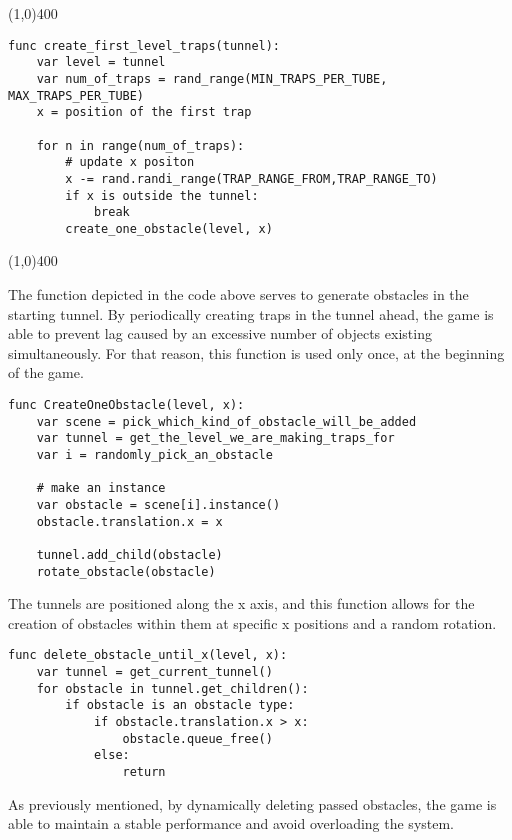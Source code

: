 \begin{center}
\line(1,0){400}
\begin{lstlisting}
func create_first_level_traps(tunnel):
	var level = tunnel
	var num_of_traps = rand_range(MIN_TRAPS_PER_TUBE, MAX_TRAPS_PER_TUBE)
	x = position of the first trap
	
	for n in range(num_of_traps):
		# update x positon
		x -= rand.randi_range(TRAP_RANGE_FROM,TRAP_RANGE_TO)
		if x is outside the tunnel:
			break
		create_one_obstacle(level, x)
\end{lstlisting}
\line(1,0){400}
\end{center}

The function depicted in the code above serves to generate obstacles in the starting tunnel. By periodically creating traps in the tunnel ahead, the game is able to prevent lag caused by an excessive number of objects existing simultaneously. For that reason, this function is used only once, at the beginning of the game.

\begin{center}
\hrulefill
\begin{lstlisting}
func CreateOneObstacle(level, x):
	var scene = pick_which_kind_of_obstacle_will_be_added
	var tunnel = get_the_level_we_are_making_traps_for
	var i = randomly_pick_an_obstacle
	
	# make an instance
	var obstacle = scene[i].instance()
	obstacle.translation.x = x
	
	tunnel.add_child(obstacle)
    rotate_obstacle(obstacle)
\end{lstlisting}
\hrulefill
\end{center}

The tunnels are positioned along the x axis, and this function allows for the creation of obstacles within them at specific x positions and a random rotation.

\begin{center}
\hrulefill
\begin{lstlisting}
func delete_obstacle_until_x(level, x):
	var tunnel = get_current_tunnel()
	for obstacle in tunnel.get_children():
		if obstacle is an obstacle type:
			if obstacle.translation.x > x:
				obstacle.queue_free()
			else:
				return
\end{lstlisting}
\hrulefill
\end{center}

As previously mentioned, by dynamically deleting passed obstacles, the game is able to maintain a stable performance and avoid overloading the system.
